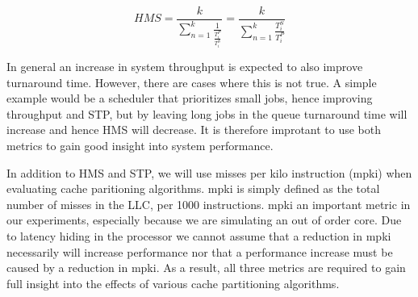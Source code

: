 \begin{equation} \label{eq:HMS}
 HMS = \frac{k}{{\sum\limits_{n=1}^{k}\frac{1}{\frac{T^{P}_i}{T^{S}_i}}}} = \frac{k}{{\sum\limits_{n=1}^{k}\frac{T^{S}_i}{T^{P}_i}}}
\end{equation}

In general an increase in system throughput is expected to also improve turnaround time.
However, there are cases where this is not true.
A simple example would be a scheduler that prioritizes small jobs, hence improving throughput and STP, but by leaving long jobs in the queue turnaround time will increase and hence HMS will decrease.
It is therefore improtant to use both metrics to gain good insight into system performance.

In addition to HMS and STP, we will use misses per kilo instruction (mpki) when evaluating cache paritioning algorithms.
mpki is simply defined as the total number of misses in the LLC, per 1000 instructions.
mpki an important metric in our experiments, especially because we are simulating an out of order core. 
Due to latency hiding in the processor we cannot assume that a reduction in mpki necessarily will increase performance nor that a performance increase must be caused by a reduction in mpki.
As a result, all three metrics are required to gain full insight into the effects of various cache partitioning algorithms.
